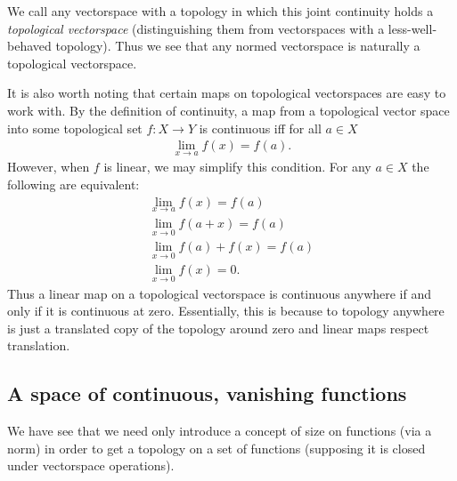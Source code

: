       We call any vectorspace with a topology in which this joint continuity holds a \emph{topological vectorspace} (distinguishing them from vectorspaces with a less-well-behaved topology).
      Thus we see that any normed vectorspace is naturally a topological vectorspace.

      It is also worth noting that certain maps on topological vectorspaces are easy to work with.
      By the definition of continuity, a map from a topological vector space into some topological set $f:X\rightarrow Y$ is continuous iff for all $a\in X$
      \begin{align*}
        \lim_{x\rightarrow a} f(x) = f(a)\text{.}
      \end{align*}
      However, when $f$ is linear, we may simplify this condition.
      For any $a\in X$ the following are equivalent:
      \begin{gather*}
        \lim_{x\rightarrow a} f(x) = f(a) \\
        \lim_{x\rightarrow 0} f(a+x) = f(a) \\
        \lim_{x\rightarrow 0} f(a)+f(x) = f(a) \\
        \lim_{x\rightarrow 0} f(x) = 0\text{.}
      \end{gather*}
      Thus a linear map on a topological vectorspace is continuous anywhere if and only if it is continuous at zero.
      Essentially, this is because to topology anywhere is just a translated copy of the topology around zero and linear maps respect translation.

      \subsection{A space of continuous, vanishing functions}

      We have see that we need only introduce a concept of size on functions (via a norm) in order to get a topology on a set of functions (supposing it is closed under vectorspace operations).

